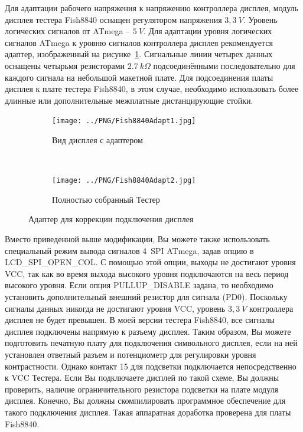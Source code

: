 Для адаптации рабочего напряжения к напряжению контроллера дисплея, модуль дисплея тестера Fish8840 
оснащен регулятором напряжения \(3,3~V\). 
Уровень логических сигналов от ATmega -- \(5~V\). Для адаптации уровня логических
сигналов ATmega к уровню сигналов контроллера дисплея рекомендуется адаптер, изображенный на рисунке~\ref{fig:Fish8840Adapt}.
Сигнальные линии четырех данных оснащены четырьмя резисторами \(2.7~k\Omega\) подсоединёнными последовательно 
для каждого сигнала на небольшой макетной плате. Для подсоединения платы дисплея к плате тестера Fish8840, в 
этом случае, необходимо использовать более длинные или дополнительные межплатные дистанцирующие стойки.
\begin{figure}[H]
  \begin{subfigure}[b]{.5\textwidth}
    \centering
    \texttt{[image: ../PNG/Fish8840Adapt1.jpg]}
    \caption{Вид дисплея с адаптером}
  \end{subfigure}
  ~
  \begin{subfigure}[b]{.5\textwidth}
    \centering
    \texttt{[image: ../PNG/Fish8840Adapt2.jpg]}
    \caption{Полностью собранный Тестер}
  \end{subfigure}
  \caption{Адаптер для коррекции подключения дисплея}
  \label{fig:Fish8840Adapt}
\end{figure}
Вместо приведенной выше модификации, Вы можете также использовать специальный режим вывода сигналов 
4~SPI ATmega, задав опцию в  LCD\_SPI\_OPEN\_COL.
С помощью этой опции, выходы не достигают уровня VCC, так как во время выхода высокого уровня 
подключаются  на весь период высокого уровня.
Если опция PULLUP\_DISABLE задана, то необходимо установить дополнительный внешний резистор для
сигнала  (PD0).
Поскольку сигналы данных никогда не достигают уровня VCC, уровень \(3,3~V\) контроллера дисплея не 
будет превышен.
В моей версии тестера Fish8840, все сигналы дисплея подключены напрямую к разъему дисплея.
Таким образом, Вы можете подготовить печатную плату для подключения символьного дисплея, если на ней установлен 
ответный разъем и потенциометр для регулировки уровня контрастности.
Однако контакт 15 для подсветки подключается непосредственно к VCC Тестера.
Если Вы подключаете дисплей по такой схеме, Вы должны проверить, наличие ограничительного резистора
подсветки на плате модуля дисплея.
Конечно, Вы должны скомпилировать программное обеспечение для такого подключения дисплея.
Такая аппаратная доработка проверена для платы Fish8840.\\

